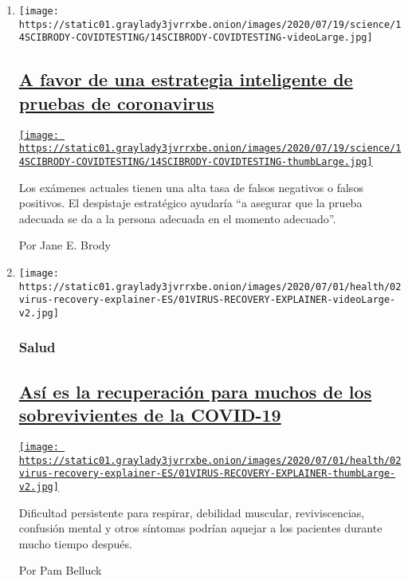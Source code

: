 \begin{enumerate}
\def\labelenumi{\arabic{enumi}.}
\item
  \texttt{[image: https://static01.graylady3jvrrxbe.onion/images/2020/07/19/science/14SCIBRODY-COVIDTESTING/14SCIBRODY-COVIDTESTING-videoLarge.jpg]}

  \hypertarget{a-favor-de-una-estrategia-inteligente-de-pruebas-de-coronavirus}{%
  \subsection{\texorpdfstring{\href{/es/2020/07/15/espanol/ciencia-y-tecnologia/coronavirus-pruebas-inteligentes-testeo.html}{A
  favor de una estrategia inteligente de pruebas de
  coronavirus}}{A favor de una estrategia inteligente de pruebas de coronavirus}}\label{a-favor-de-una-estrategia-inteligente-de-pruebas-de-coronavirus}}

  \href{/es/2020/07/15/espanol/ciencia-y-tecnologia/coronavirus-pruebas-inteligentes-testeo.html}{\texttt{[image: https://static01.graylady3jvrrxbe.onion/images/2020/07/19/science/14SCIBRODY-COVIDTESTING/14SCIBRODY-COVIDTESTING-thumbLarge.jpg]}}

  Los exámenes actuales tienen una alta tasa de falsos negativos o
  falsos positivos. El despistaje estratégico ayudaría ``a asegurar que
  la prueba adecuada se da a la persona adecuada en el momento
  adecuado''.

  Por Jane E. Brody
\item
  \texttt{[image: https://static01.graylady3jvrrxbe.onion/images/2020/07/01/health/02virus-recovery-explainer-ES/01VIRUS-RECOVERY-EXPLAINER-videoLarge-v2.jpg]}

  \hypertarget{salud}{%
  \subsubsection{Salud}\label{salud}}

  \hypertarget{asuxed-es-la-recuperaciuxf3n-para-muchos-de-los-sobrevivientes-de-la-covid-19}{%
  \subsection{\texorpdfstring{\href{/es/2020/07/02/espanol/ciencia-y-tecnologia/sobrevivientes-coronavirus-recuperacion.html}{Así
  es la recuperación para muchos de los sobrevivientes de la
  COVID-19}}{Así es la recuperación para muchos de los sobrevivientes de la COVID-19}}\label{asuxed-es-la-recuperaciuxf3n-para-muchos-de-los-sobrevivientes-de-la-covid-19}}

  \href{/es/2020/07/02/espanol/ciencia-y-tecnologia/sobrevivientes-coronavirus-recuperacion.html}{\texttt{[image: https://static01.graylady3jvrrxbe.onion/images/2020/07/01/health/02virus-recovery-explainer-ES/01VIRUS-RECOVERY-EXPLAINER-thumbLarge-v2.jpg]}}

  Dificultad persistente para respirar, debilidad muscular,
  reviviscencias, confusión mental y otros síntomas podrían aquejar a
  los pacientes durante mucho tiempo después.

  Por Pam Belluck
\end{enumerate}

